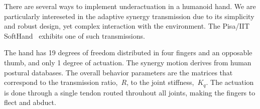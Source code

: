 
There are several ways to implement underactuation in a humanoid hand. We are particularly intereseted in the adaptive synergy transmission due to its simplicity and robust design, yet complex interaction with the environment. The Pisa/IIT SoftHand~\cite{Catalano2014Adaptive} exhibits one of such transmissions.

The hand has 19 degrees of freedom distributed in four fingers and an opposable thumb, and only 1 degree of actuation. The synergy motion derives from human postural databases. The overall behavior parameters are the matrices that correspond to the transmission ratio,~$R$, to the joint stiffness,~$K_q$. The actuation is done through a single tendon routed throuhout all joints, making the fingers to flect and abduct.


